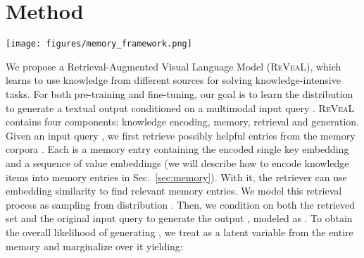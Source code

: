 \documentclass[10pt,twocolumn,letterpaper]{article}
\newcommand{\method}{R\textsc{e}V\textsc{ea}L\xspace}
\begin{document}
 \section{Method}\label{sec:approach}
\begin{figure*}[ht!]
    \vspace{-2em}
    \centering
    \texttt{[image: figures/memory\_framework.png]}
    \caption{
\textbf{The overall workflow of \method} consists of four main steps: \textbf{(a)} encode a multimodal input into a sequence of token embeddings and a summarized query embedding; \textbf{(b)} encode each knowledge entry from different corpus into unified key and value embedding pairs, where key is used to index the memory and value contains full information of the knowledge; \textbf{(c)} retrieve top-K 
most similar knowledge items from different knowledge sources, and return the pre-computed in-memory value embeddings and re-encoded value; 
and \textbf{(d)} fuse the top-K knowledge items via attentive knowledge fusion layer by injecting the retrieval score as a prior during attention calculation.
    This facilitates \method's key novelty: the memory, encoder, retriever and the generator can be jointly trained in an end-to-end manner. 
}
    \label{fig:framework}
    \vspace{-.1in}
\end{figure*}









We propose a Retrieval-Augmented Visual Language Model (\method), which learns to use knowledge from different sources for solving knowledge-intensive tasks.
For both pre-training and fine-tuning, our goal is to learn the distribution  to generate a textual output  conditioned on a multimodal input query . \method contains four components: knowledge encoding, memory, retrieval and generation. 
Given an input query , we first retrieve  possibly helpful entries  from the memory corpora . Each  is a memory entry containing the encoded single key embedding and a sequence of value embeddings (we will describe how to encode knowledge items into memory entries in Sec.~\ref{sec:memory}). With it, the retriever can use embedding similarity to find relevant memory entries.
We model this retrieval process as sampling from distribution . Then, we condition on both the retrieved set  and the original input query  to generate the output , modeled as . To obtain the overall likelihood of generating , we treat  as a latent variable from the entire memory  and marginalize over it yielding:
 
\end{document}
